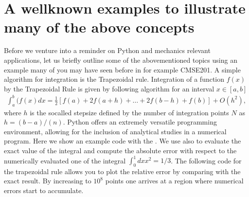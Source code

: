 \documentclass[letterpaper,10pt,english]{sphinxmanual}
\begin{document}
\chapter{A well\sphinxhyphen{}known examples to illustrate many of the above concepts}
\label{\detokenize{chapter1:a-well-known-examples-to-illustrate-many-of-the-above-concepts}}
Before we venture into a reminder on Python and mechanics relevant applications, let us briefly outline some of the
abovementioned topics using an example many of you may have seen before in for example CMSE201.
A simple algorithm for integration is the Trapezoidal rule.
Integration of a function \(f(x)\) by the Trapezoidal Rule is given by following algorithm for an interval \(x \in [a,b]\)
\begin{equation*}
\begin{split}
\int_a^b(f(x) dx = \frac{1}{2}\left [f(a)+2f(a+h)+\dots+2f(b-h)+f(b)\right] +O(h^2),
\end{split}
\end{equation*}
where \(h\) is the so\sphinxhyphen{}called stepsize defined by the number of integration points \(N\) as \(h=(b-a)/(n)\).
Python offers an  extremely versatile programming  environment, allowing for
the inclusion of analytical studies in a numerical program. Here we show an
example code with the . We use also  to evaluate the exact value of the integral and compute the absolute error
with respect to the numerically evaluated one of the integral
\(\int_0^1 dx x^2 = 1/3\).
The following code for  the trapezoidal rule allows you  to plot the relative error by comparing with the exact result. By increasing to \(10^8\) points one arrives at a region where numerical errors start to accumulate.
\end{document}
